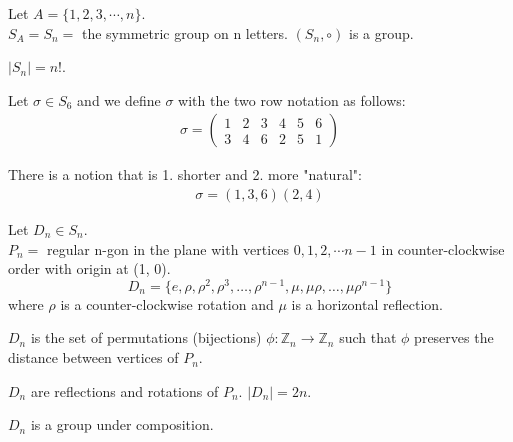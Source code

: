 
\begin{eg}
    Let $A = \{1, 2, 3, \cdots, n\}$.\\
    $S_A = S_n = $ the symmetric group on n letters. 
    $(S_n, \circ)$ is a group.
\end{eg}

\begin{remark}
    $|S_n| = n!$.
\end{remark}

\begin{eg}
    Let $\sigma \in S_6$ and we define $\sigma$ with the two row notation as follows:
    \begin{align*}
        \sigma = \begin{pmatrix}
            1 & 2 & 3 & 4 & 5 & 6\\
            3 & 4 & 6 & 2 & 5 & 1
        \end{pmatrix}
    \end{align*}
\end{eg}

\begin{eg}
    There is a notion that is 1. shorter and 2. more "natural": 
    \begin{align*}
        \sigma = (1, 3, 6)(2, 4)
    \end{align*}
\end{eg}

\begin{definition}
    Let $D_n \in S_n$.\\
    $P_n =$ regular n-gon in the plane with vertices ${0, 1, 2, \cdots n-1}$ in counter-clockwise order with origin at (1, 0).
    \[
    D_n = \{ e, \rho, \rho^2, \rho^3, \ldots, \rho^{n-1}, \mu, \mu \rho, \ldots, \mu \rho^{n-1} \}
    \]
    where $\rho$ is a counter-clockwise rotation and $\mu$ is a horizontal reflection.
\end{definition}

\begin{definition}
    $D_n$ is the set of permutations (bijections) $\phi: \mathbb{Z}_n \to \mathbb{Z}_n$ such that $\phi$ preserves the distance between vertices of $P_n$.
\end{definition}

\begin{theorem}
    $D_n$ are reflections and rotations of $P_n$.
    $|D_n| = 2n$.
\end{theorem}

\begin{theorem}
    $D_n$ is a group under composition.
\end{theorem}